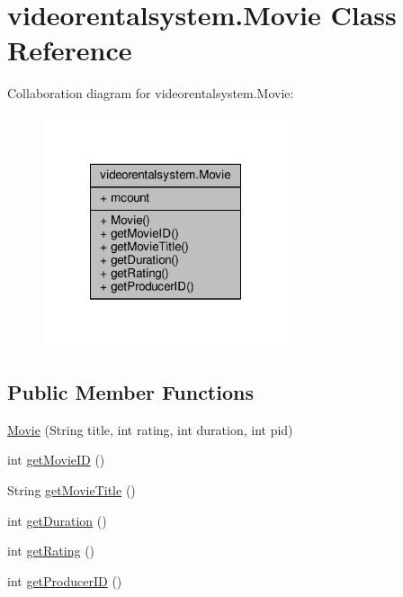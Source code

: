 \hypertarget{classvideorentalsystem_1_1Movie}{\section{videorentalsystem.\-Movie Class Reference}
\label{classvideorentalsystem_1_1Movie}
}


Collaboration diagram for videorentalsystem.\-Movie\-:
\nopagebreak
\begin{figure}[H]
\begin{center}
\leavevmode
\includegraphics[width=204pt]{classvideorentalsystem_1_1Movie__coll__graph}
\end{center}
\end{figure}
\subsection*{Public Member Functions}
\begin{DoxyCompactItemize}
\item 
\hyperlink{classvideorentalsystem_1_1Movie_aa15a6b662ad8cbdcae50a0e4f4dc2b40}{Movie} (String title, int rating, int duration, int pid)
\item 
int \hyperlink{classvideorentalsystem_1_1Movie_a9174bd5c863d6f53b4cd95c97bb20a6e}{get\-Movie\-I\-D} ()
\item 
String \hyperlink{classvideorentalsystem_1_1Movie_ac32ecf7669f0ab12b51b1e6830b837ca}{get\-Movie\-Title} ()
\item 
int \hyperlink{classvideorentalsystem_1_1Movie_a39a713990661cb3220fc2514b974823d}{get\-Duration} ()
\item 
int \hyperlink{classvideorentalsystem_1_1Movie_a419b38a9fccffc255f3863ad9830df30}{get\-Rating} ()
\item 
int \hyperlink{classvideorentalsystem_1_1Movie_ad96ae53d6d7f646c62e4500625d068ee}{get\-Producer\-I\-D} ()
\end{DoxyCompactItemize}
